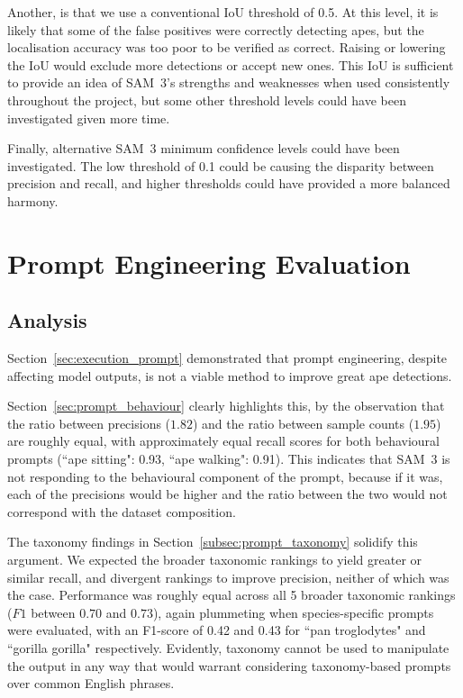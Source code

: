 \documentclass[author={Jacob Stephenson},
    degree={BSc},
    title={Robust Great Ape Species Detection in Wild Camera Trap Imagery with Promptable Concept Segmentation},
    unit={COMS30045},
    subtitle={}]{dissertation}
\begin{document}
Another, is that we use a conventional IoU threshold of 0.5. At this level, it is likely that some of the false positives were correctly detecting apes, but the localisation accuracy was too poor to be verified as correct. Raising or lowering the IoU would exclude more detections or accept new ones. This IoU is sufficient to provide an idea of SAM~3's strengths and weaknesses when used consistently throughout the project, but some other threshold levels could have been investigated given more time.

Finally, alternative SAM~3 minimum confidence levels could have been investigated. The low threshold of 0.1 could be causing the disparity between precision and recall, and higher thresholds could have provided a more balanced harmony.




\section{Prompt Engineering Evaluation}

\subsection{Analysis}

Section~\ref{sec:execution_prompt} demonstrated that prompt engineering, despite affecting model outputs, is not a viable method to improve great ape detections.

Section~\ref{sec:prompt_behaviour} clearly highlights this, by the observation that the ratio between precisions ($1.82$) and the ratio between sample counts ($1.95$) are roughly equal, with approximately equal recall scores for both behavioural prompts (``ape sitting": 0.93, ``ape walking": 0.91). This indicates that SAM~3 is not responding to the behavioural component of the prompt, because if it was, each of the precisions would be higher and the ratio between the two would not correspond with the dataset composition.

The taxonomy findings in Section~\ref{subsec:prompt_taxonomy} solidify this argument. We expected the broader taxonomic rankings to yield greater or similar recall, and divergent rankings to improve precision, neither of which was the case. Performance was roughly equal across all 5 broader taxonomic rankings ($F1$ between $0.70$ and $0.73$), again plummeting when species-specific prompts were evaluated, with an F1-score of 0.42 and 0.43 for ``pan troglodytes" and ``gorilla gorilla" respectively. Evidently, taxonomy cannot be used to manipulate the output in any way that would warrant considering taxonomy-based prompts over common English phrases.
\end{document}
